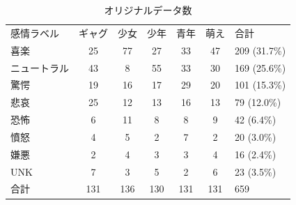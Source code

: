 \begin{table}[!ht]
\begin{center}
\caption{オリジナルデータ数} %
\label{table:data_ori} %
\begin{tabular}{lccccc|l}
\hline
\multirow{2}{*}{感情ラベル} & \multirow{2}{*}{ギャグ} & \multirow{2}{*}{少女} & \multirow{2}{*}{少年} & \multirow{2}{*}{青年} & \multirow{2}{*}{萌え} & \multirow{2}{*}{合計} \\
                       &                      &                     &                     &                     &                     &                     \\ \hline
喜楽                     & 25                   & 77                  & 27                  & 33                  & 47                  & 209 (31.7\%)        \\ \hline
ニュートラル                 & 43                   & 8                   & 55                  & 33                  & 30                  & 169 (25.6\%)        \\
驚愕                     & 19                   & 16                  & 17                  & 29                  & 20                  & 101 (15.3\%)        \\
悲哀                     & 25                   & 12                  & 13                  & 16                  & 13                  & 79 (12.0\%)         \\
恐怖                     & 6                    & 11                  & 8                   & 8                   & 9                   & 42 (6.4\%)          \\
憤怒                     & 4                    & 5                   & 2                   & 7                   & 2                   & 20 (3.0\%)          \\
嫌悪                     & 2                    & 4                   & 3                   & 3                   & 4                   & 16 (2.4\%)          \\ \hline
UNK                    & 7                    & 3                   & 5                   & 2                   & 6                   & 23 (3.5\%)          \\ \hline
合計                     & 131                  & 136                 & 130                 & 131                 & 131                 & 659
\end{tabular}
\end{center}
\end{table}

